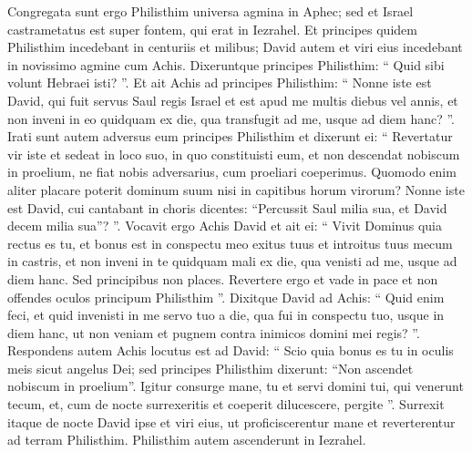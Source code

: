 \begin{biblechapter}
\begin{biblechapter}
\begin{biblechapter}
\begin{biblechapter}
\begin{biblechapter}
\begin{biblechapter}
\begin{biblechapter}
\begin{biblechapter}
\begin{biblechapter}
\begin{biblechapter}
\begin{biblechapter}
\begin{biblechapter}
\begin{biblechapter}
\begin{biblechapter}
\begin{biblechapter}
\begin{biblechapter}
\begin{biblechapter}
\begin{biblechapter}
\begin{biblechapter}
\begin{biblechapter}
\begin{biblechapter}
\begin{biblechapter}
\begin{biblechapter}
\begin{biblechapter}
\begin{biblechapter}
\begin{biblechapter}
\begin{biblechapter}
\begin{biblechapter}
\begin{biblechapter}
\verse Congregata sunt ergo Philisthim universa agmina in Aphec; sed et Israel castrametatus est super fontem, qui erat in Iezrahel. 
\verse Et principes quidem Philisthim incedebant in centuriis et milibus; David autem et viri eius incedebant in novissimo agmine cum Achis. 
\verse Dixeruntque principes Philisthim: “ Quid sibi volunt Hebraei isti? ”. Et ait Achis ad principes Philisthim: “ Nonne iste est David, qui fuit servus Saul regis Israel et est apud me multis diebus vel annis, et non inveni in eo quidquam ex die, qua transfugit ad me, usque ad diem hanc? ”. 
\verse Irati sunt autem adversus eum principes Philisthim et dixerunt ei: “ Revertatur vir iste et sedeat in loco suo, in quo constituisti eum, et non descendat nobiscum in proelium, ne fiat nobis adversarius, cum proeliari coeperimus. Quomodo enim aliter placare poterit dominum suum nisi in capitibus horum virorum? 
\verse Nonne iste est David, cui cantabant in choris dicentes: “Percussit Saul milia sua, et David decem milia sua”? ”.
 \verse Vocavit ergo Achis David et ait ei: “ Vivit Dominus quia rectus es tu, et bonus est in conspectu meo exitus tuus et introitus tuus mecum in castris, et non inveni in te quidquam mali ex die, qua venisti ad me, usque ad diem hanc. Sed principibus non places. 
\verse Revertere ergo et vade in pace et non offendes oculos principum Philisthim ”. 
\verse Dixitque David ad Achis: “ Quid enim feci, et quid invenisti in me servo tuo a die, qua fui in conspectu tuo, usque in diem hanc, ut non veniam et pugnem contra inimicos domini mei regis? ”. 
\verse Respondens autem Achis locutus est ad David: “ Scio quia bonus es tu in oculis meis sicut angelus Dei; sed principes Philisthim dixerunt: “Non ascendet nobiscum in proelium”. 
\verse Igitur consurge mane, tu et servi domini tui, qui venerunt tecum, et, cum de nocte surrexeritis et coeperit dilucescere, pergite ”. 
\verse Surrexit itaque de nocte David ipse et viri eius, ut proficiscerentur mane et reverterentur ad terram Philisthim. Philisthim autem ascenderunt in Iezrahel.
 

\end{biblechapter}
\end{biblechapter}
\end{biblechapter}
\end{biblechapter}
\end{biblechapter}
\end{biblechapter}
\end{biblechapter}
\end{biblechapter}
\end{biblechapter}
\end{biblechapter}
\end{biblechapter}
\end{biblechapter}
\end{biblechapter}
\end{biblechapter}
\end{biblechapter}
\end{biblechapter}
\end{biblechapter}
\end{biblechapter}
\end{biblechapter}
\end{biblechapter}
\end{biblechapter}
\end{biblechapter}
\end{biblechapter}
\end{biblechapter}
\end{biblechapter}
\end{biblechapter}
\end{biblechapter}
\end{biblechapter}
\end{biblechapter}
